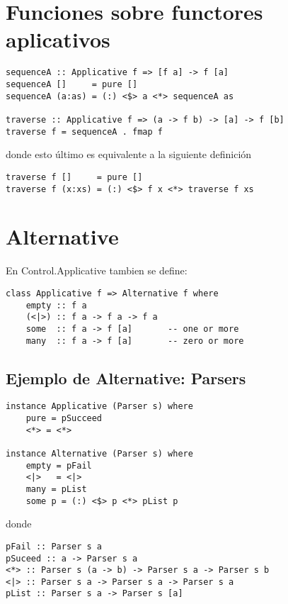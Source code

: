 \documentclass{article}
\newcommand{\imp}[1]{\textcolor{color1}{#1}}
\begin{document}
\section{Funciones sobre functores aplicativos}\label{sec:funciones_sobre_functores_aplicativos}

\begin{lstlisting}
sequenceA :: Applicative f => [f a] -> f [a]
sequenceA []     = pure []
sequenceA (a:as) = (:) <$> a <*> sequenceA as

traverse :: Applicative f => (a -> f b) -> [a] -> f [b]
traverse f = sequenceA . fmap f
\end{lstlisting}
    
donde esto último es equivalente a la siguiente definición
\begin{lstlisting}    
traverse f []     = pure []
traverse f (x:xs) = (:) <$> f x <*> traverse f xs
\end{lstlisting}

\section{Alternative}\label{sec:alternative}

\noindent En \imp{Control.Applicative} tambien se define:

\begin{lstlisting}
class Applicative f => Alternative f where
    empty :: f a
    (<|>) :: f a -> f a -> f a
    some  :: f a -> f [a]       -- one or more
    many  :: f a -> f [a]       -- zero or more
\end{lstlisting}

\subsection{Ejemplo de Alternative: Parsers}\label{subsec:ejemplo_de_alternative_parsers}

\begin{lstlisting}
instance Applicative (Parser s) where
    pure = pSucceed
    <*> = <*>

instance Alternative (Parser s) where
    empty = pFail
    <|>   = <|>
    many = pList
    some p = (:) <$> p <*> pList p
\end{lstlisting}

donde

\begin{lstlisting}
pFail :: Parser s a
pSuceed :: a -> Parser s a
<*> :: Parser s (a -> b) -> Parser s a -> Parser s b
<|> :: Parser s a -> Parser s a -> Parser s a
pList :: Parser s a -> Parser s [a]
\end{lstlisting}
\end{document}
